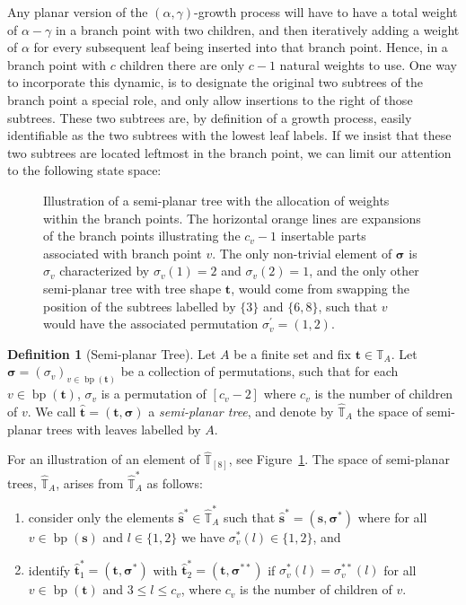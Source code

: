 \documentclass[a4paper, final]{amsart}
\theoremstyle{plain}
\theoremstyle{definition}
\newtheorem{defi}[thm]{Definition}
\newcommand{\tree}[1][t]{\boldsymbol{#1}}
\newcommand{\that}[1][t]{\hat{\boldsymbol{#1}}} %
\newcommand{\treesigma}[1][\sigma]{\boldsymbol{#1}}
\newcommand{\Thatspace}[1][\T]{\widehat{\boldsymbol{#1}}} %
\newcommand{\T}{\mathbb{T}}
\DeclareMathOperator{\branchpoints}{bp}
\begin{document}
Any planar version of the $(\alpha, \gamma)$-growth process will have to have a total weight of $\alpha - \gamma$ in a branch point with two children, and then iteratively adding a weight of $\alpha$ for every subsequent leaf being inserted into that branch point.
Hence, in a branch point with $c$ children there are only $c-1$ natural weights to use.
One way to incorporate this dynamic, is to designate the original two subtrees of the branch point a special role, and only allow insertions to the right of those subtrees.
These two subtrees are, by definition of a growth process, easily identifiable as the two subtrees with the lowest leaf labels.
If we insist that these two subtrees are located leftmost in the branch point, we can limit our attention to the following state space:
%
\begin{figure}[t]
  \centering
  
  \caption{Illustration of a semi-planar tree with the allocation of weights within the branch points.
    The horizontal orange lines are expansions of the branch points illustrating the $c_v - 1$ insertable parts associated with branch point $v$.
    The only non-trivial element of $\treesigma$ is $\sigma_v$ characterized by $\sigma_v(1) = 2$ and $\sigma_v(2) = 1$, and the only other semi-planar tree with tree shape $\tree$, would come from swapping the position of the subtrees labelled by $\{3\}$ and $\{6,8\}$, such that $v$ would have the associated permutation $\sigma_v^\prime = (1,2)$.}
  \label{fig:semiplanar_element}
\end{figure}
%
\begin{defi}[Semi-planar Tree]\label{def:semiplanartree}
  Let $A$ be a finite set and fix $\tree \in \T_A$.
  Let $\treesigma = {\left( \sigma_v \right)}_{v \in \branchpoints(\tree)}$ be a collection of permutations, such that for each $v \in \branchpoints (\tree)$, $\sigma_v$ is a permutation of $\left[ c_v - 2 \right]$ where $c_v$ is the number of children of $v$.
  We call $\that = (\tree, \treesigma)$ a \textit{semi-planar tree}, and denote by $\Thatspace_A$ the space of semi-planar trees with leaves labelled by $A$.
\end{defi}
%
For an illustration of an element of $\Thatspace_{[8]}$, see Figure~\ref{fig:semiplanar_element}.
The space of semi-planar trees, $\Thatspace_A$, arises from $\Thatspace_A^*$ as follows:
%
\begin{enumerate}
  \item consider only the elements ${\that[s]}^* \in \Thatspace_A^*$ such that ${\that[s]}^* = (\tree[s], \treesigma^*)$ where for all $v \in \branchpoints(\tree[s])$ and $l \in \{1,2\}$ we have $\sigma_v^*(l) \in \{1, 2\}$, and
  \item identify $\that_1^* = (\tree, \treesigma^*)$ with $\that_2^* = (\tree, \treesigma^{**})$ if $\sigma_v^*(l) = \sigma_v^{**}(l)$ for all $v \in \branchpoints(\tree)$ and $3 \leq l \leq c_v$, where $c_v$ is the number of children of $v$.
\end{enumerate}
\end{document}
